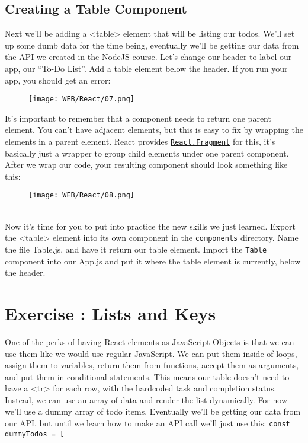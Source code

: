 \documentclass{42-en}
\begin{document}
\section{Creating a Table Component}
Next we’ll be adding a <table> element that will be listing our todos. We’ll set up some dumb data for the time being, eventually we’ll be getting our data from the API we created in the NodeJS course. Let’s change our header to label our app, our “To-Do List”. Add a table element below the header. If you run your app, you should get an error:
\begin{figure}[H]
    \begin{center}
        \texttt{[image: WEB/React/07.png]}
    \end{center}
\end{figure}
It’s important to remember that a component needs to return one parent element. You can’t have adjacent elements, but this is easy to fix by wrapping the elements in a parent element. React provides \href{https://reactjs.org/docs/fragments.html}{\texttt{React.Fragment}} for this, it’s basically just a wrapper to group child elements under one parent component. After we wrap our code, your resulting component should look something like this:
\begin{figure}[H]
    \begin{center}
        \texttt{[image: WEB/React/08.png]}
    \end{center}
\end{figure}
~\\
Now it’s time for you to put into practice the new skills we just learned. Export the <table> element into its own component in the \texttt{components} directory. Name the file Table.js, and have it return our table element. Import the \texttt{Table} component into our App.js and put it where the table element is currently, below the header.
\nextexercice

\chapter{Exercise \exercicenumber: Lists and Keys}
One of the perks of having React elements as JavaScript Objects is that we can use them like we would use regular JavaScript. We can put them inside of loops, assign them to variables, return them from functions, accept them as arguments, and put them in conditional statements. This means our table doesn’t need to have a <tr> for each row, with the hardcoded task and completion status. Instead, we can use an array of data and render the list dynamically. For now we’ll use a dummy array of todo items. Eventually we’ll be getting our data from our API, but until we learn how to make an API call we’ll just use this:
\newline
\texttt{const dummyTodos = [}
\end{document}
